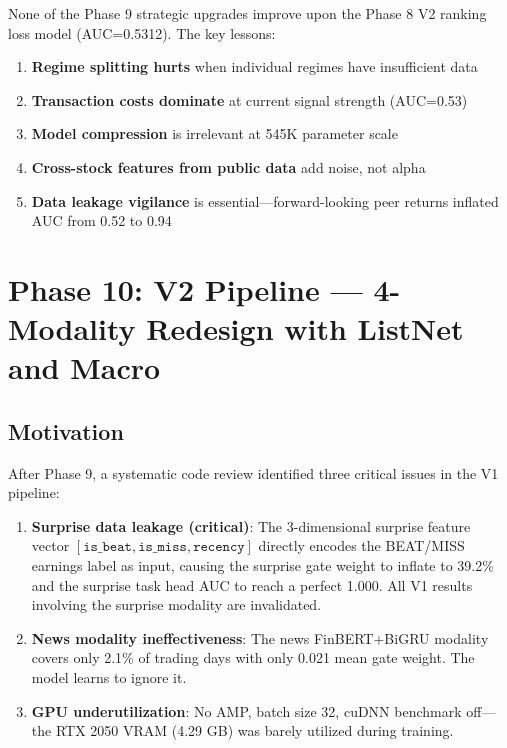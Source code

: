 \documentclass[12pt,a4paper]{article}
\begin{document}
\noindent None of the Phase 9 strategic upgrades improve upon the Phase 8 V2 ranking loss 
model (AUC=0.5312). The key lessons:
\begin{enumerate}
    \item \textbf{Regime splitting hurts} when individual regimes have insufficient data
    \item \textbf{Transaction costs dominate} at current signal strength (AUC=0.53)
    \item \textbf{Model compression} is irrelevant at 545K parameter scale
    \item \textbf{Cross-stock features from public data} add noise, not alpha
    \item \textbf{Data leakage vigilance} is essential---forward-looking peer returns inflated AUC from 0.52 to 0.94
\end{enumerate}


\section{Phase 10: V2 Pipeline --- 4-Modality Redesign with ListNet and Macro}

\subsection{Motivation}

After Phase 9, a systematic code review identified three critical issues in the V1 pipeline:
\begin{enumerate}
    \item \textbf{Surprise data leakage (critical)}: The 3-dimensional surprise feature vector
          $[\texttt{is\_beat}, \texttt{is\_miss}, \texttt{recency}]$ directly encodes the
          BEAT/MISS earnings label as input, causing the surprise gate weight to inflate to 39.2\%
          and the surprise task head AUC to reach a perfect 1.000. All V1 results involving the
          surprise modality are invalidated.
    \item \textbf{News modality ineffectiveness}: The news FinBERT+BiGRU modality covers only
          2.1\% of trading days with only 0.021 mean gate weight. The model learns to ignore it.
    \item \textbf{GPU underutilization}: No AMP, batch size 32, cuDNN benchmark off---the RTX 2050
          VRAM (4.29 GB) was barely utilized during training.
\end{enumerate}
\end{document}
